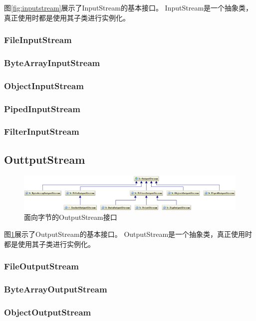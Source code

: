\documentclass[a4paper,11pt]{article}
\begin{document}
图\ref{fig:inputstream}展示了InputStream的基本接口。
InputStream是一个抽象类，真正使用时都是使用其子类进行实例化。

\subsubsection[FileInputStream]{FileInputStream}
\subsubsection[ByteArrayInputStream]{ByteArrayInputStream}
\subsubsection[ObjectInputStream]{ObjectInputStream}
\subsubsection[PipedInputStream]{PipedInputStream}
\subsubsection[FilterInputStream]{FilterInputStream}

\subsection[OutputStream]{OuttputStream}
\begin{figure}
  \centering
  \includegraphics[width=.9\textwidth]{picturedir/outputstream.png}
  \caption{面向字节的OutputStream接口}
  \label{fig:outputstream}
\end{figure}

图\ref{fig:outputstream}展示了OutputStream的基本接口。
OutputStream是一个抽象类，真正使用时都是使用其子类进行实例化。
\subsubsection[FileOutputStream]{FileOutputStream}
\subsubsection[ByteArrayOutputStream]{ByteArrayOutputStream}
\subsubsection[ObjectOutputStream]{ObjectOutputStream}
\end{document}
